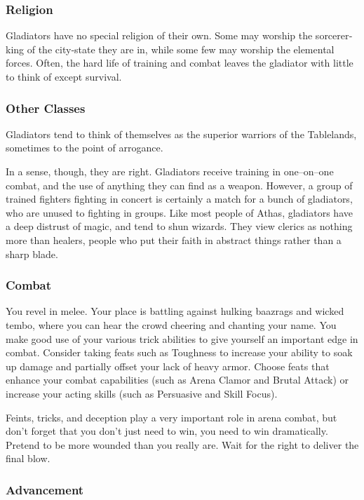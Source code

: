 \subsubsection{Religion}

Gladiators have no special religion of their own. Some may worship the sorcerer‐king of the city‐state they are in, while some few may worship the elemental forces. Often, the hard life of training and combat leaves the gladiator with little to think of except survival.

\subsubsection{Other Classes}

Gladiators tend to think of themselves as the superior warriors of the Tablelands, sometimes to the point of arrogance.

In a sense, though, they are right. Gladiators receive training in one–on–one combat, and the use of anything they can find as a weapon. However, a group of trained fighters fighting in concert is certainly a match for a bunch of gladiators, who are unused to fighting in groups. Like most people of Athas, gladiators have a deep distrust of magic, and tend to shun wizards. They view clerics as nothing more than healers, people who put their faith in abstract things rather than a sharp blade.

\subsubsection{Combat}

You revel in melee. Your place is battling against hulking baazrags and wicked tembo, where you can hear the crowd cheering and chanting your name. You make good use of your various trick abilities to give yourself an important edge in combat. Consider taking feats such as Toughness to increase your ability to soak up damage and partially offset your lack of heavy armor. Choose feats that enhance your combat capabilities (such as Arena Clamor and Brutal Attack) or increase your acting skills (such as Persuasive and Skill Focus).

Feints, tricks, and deception play a very important role in arena combat, but don’t forget that you don’t just need to win, you need to win dramatically. Pretend to be more wounded than you really are. Wait for the right to deliver the final blow.

\subsubsection{Advancement}

